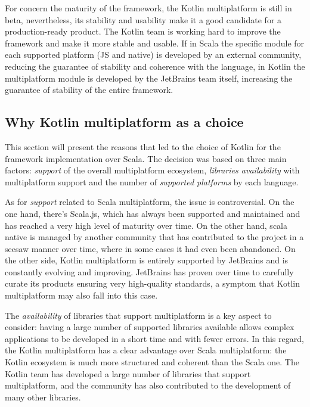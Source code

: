 For concern the maturity of the framework, the Kotlin multiplatform is still in beta, nevertheless, its stability and usability make it a
good candidate for a production-ready product. The Kotlin team is working hard to improve the framework and make it more stable and usable.
If in Scala the specific module for each supported platform (JS and native) is developed by an external community, reducing the guarantee of stability
and coherence with the language, in Kotlin the multiplatform module is developed by the JetBrains team itself, increasing the guarantee of stability
of the entire framework.

\subsection{Why Kotlin multiplatform as a choice}

This section will present the reasons that led to the choice of Kotlin for the framework implementation over Scala.
The decision was based on three main factors: \emph{support} of the overall multiplatform ecosystem, \emph{libraries availability} with
multiplatform support and the number of \emph{supported platforms} by each language.

As for \emph{support} related to Scala multiplatform, the issue is controversial. On the one hand, there's Scala.js, which has always been
supported and maintained and has reached a very high level of maturity over time. On the other hand, scala native is managed by another community that
has contributed to the project in a seesaw manner over time, where in some cases it had even been abandoned.
On the other side, Kotlin multiplatform is entirely supported by JetBrains and is constantly evolving and improving. JetBrains has proven over time
to carefully curate its products ensuring very high-quality standards, a symptom that Kotlin multiplatform may also fall into this case.

The \emph{availability} of libraries that support multiplatform is a key aspect to consider: having a large number of supported libraries available
allows complex applications to be developed in a short time and with fewer errors.
In this regard, the Kotlin multiplatform has a clear advantage over Scala multiplatform: the Kotlin ecosystem is much more structured and coherent
than the Scala one. The Kotlin team has developed a large number of libraries that support multiplatform, and the community has also contributed to
the development of many other libraries.

